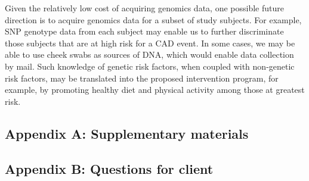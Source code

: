 \documentclass[11pt,]{article}
\begin{document}
Given the relatively low cost of acquiring genomics data, one possible
future direction is to acquire genomics data for a subset of study
subjects. For example, SNP genotype data from each subject may enable us
to further discriminate those subjects that are at high risk for a CAD
event. In some cases, we may be able to use cheek swabs as sources of
DNA, which would enable data collection by mail. Such knowledge of
genetic risk factors, when coupled with non-genetic risk factors, may be
translated into the proposed intervention program, for example, by
promoting healthy diet and physical activity among those at greatest
risk.

\newpage

\subsection{Appendix A: Supplementary
materials}\label{appendix-a-supplementary-materials}

\newpage 

\subsection{Appendix B: Questions for
client}\label{appendix-b-questions-for-client}
\end{document}
